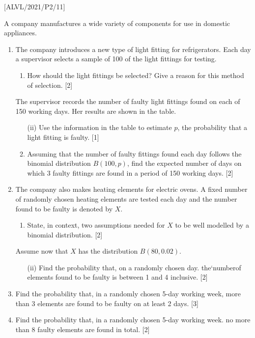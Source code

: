 \item {[}ALVL/2021/P2/11{]}

A company manufactures a wide variety of components for use in domestic
appliances. 
\begin{enumerate}
\item The company introduces a new type of light fitting for refrigerators.
Each day a supervisor selects a sample of 100 of the light fittings
for testing. 
\begin{enumerate}
\item How should the light fittings be selected? Give a reason for this
method of selection. \hfill{}{[}2{]}
\end{enumerate}
The supervisor records the number of faulty light fittings found on
each of 150 working days. Her results are shown in the table. 
\begin{enumerate}
\item[(ii)]  Use the information in the table to estimate $p$, the probability
that a light fitting is faulty. \hfill{}{[}1{]}
\item Assuming that the number of faulty fittings found each day follows
the binomial distribution $B\left(100,p\right)$, find the expected
number of days on which 3 faulty fittings are found in a period of
150 working days. \hfill{}{[}2{]}
\end{enumerate}
\item The company also makes heating elements for electric ovens. A fixed
number of randomly chosen heating elements are tested each day and
the number found to be faulty is denoted by $X$. 
\begin{enumerate}
\item State, in context, two assumptions needed for $X$ to be well modelled
by a binomial distribution. \hfill{}{[}2{]}
\end{enumerate}
Assume now that $X$ has the distribution $B\left(80,0.02\right)$.
\begin{enumerate}
\item[(ii)]  Find the probability that, on a randomly chosen day. the\textquoteleft numberof
elements found to be faulty is between 1 and 4 inclusive. \hfill{}
{[}2{]}
\end{enumerate}
\item Find the probability that, in a randomly chosen 5-day working week,
more than 3 elements are found to be faulty on at least 2 days. \hfill{}
{[}3{]}
\item Find the probability that, in a randomly chosen 5-day working week.
no more than 8 faulty elements are found in total. \hfill{} {[}2{]}
\end{enumerate}
